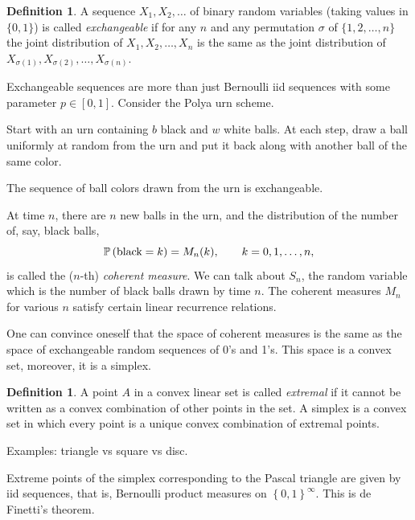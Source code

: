 \documentclass[letterpaper,11pt,oneside,reqno]{article}
\numberwithin{equation}{section}
\theoremstyle{definition}
\newtheorem{definition}[proposition]{Definition}
\begin{document}
\begin{definition}
	A sequence $X_1,X_2,\ldots $
	of binary random variables
	(taking values in $\{0,1\}$)
	is called \emph{exchangeable}
	if for any $n$ and any permutation $\sigma$ of $\{1,2,\ldots,n\}$ the joint distribution of $X_1,X_2,\ldots,X_n$ is the same as the joint distribution of $X_{\sigma(1)},X_{\sigma(2)},\ldots,X_{\sigma(n)}$.
\end{definition}

Exchangeable sequences are more than just Bernoulli iid sequences with some
parameter $p\in[0,1]$. Consider the Polya urn scheme.

Start with an urn containing $b$ black and $w$ white balls.
At each step, draw a ball uniformly at random from the urn
and put it back along with another ball of the same color.

The sequence of ball colors drawn from the urn is exchangeable.

At time $n$, there are $n$ new balls in the urn, and the distribution of the number of, say,
black balls,
\begin{equation*}
	\operatorname{\mathbb{P}}\left( \textnormal{black}=k \right) = M_n(k),
	\qquad k=0,1,\ldots,n,
\end{equation*}
is called the ($n$-th) \emph{coherent measure}.
We can talk about $S_n$, the random variable which is the number of black balls drawn by time $n$.
The coherent measures $M_n$ for various $n$ satisfy certain linear
recurrence relations.

One can convince oneself that the space of coherent measures is
the same as the space of exchangeable random sequences of 0's and 1's.
This space is a convex set, moreover, it is a simplex.

\begin{definition}
	A point $A$ in a convex linear set is called
	\emph{extremal} if it cannot be written as a convex combination of other points in the set.
	A simplex is a convex set in which every point is a unique
	convex combination of extremal points.

	Examples: triangle vs square vs disc.
\end{definition}

Extreme points of the simplex corresponding to the Pascal triangle
are given by iid sequences,
that is, Bernoulli product measures on $\left\{ 0,1 \right\}^\infty$.
This is de Finetti's theorem.

\subsection{}
\end{document}
